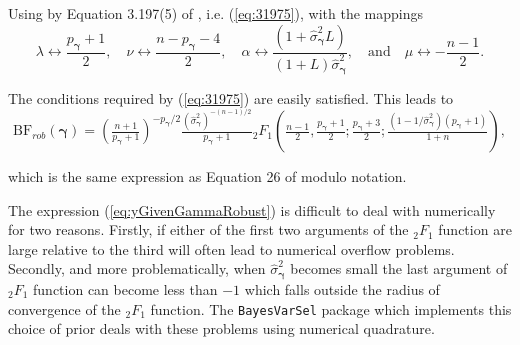 \documentclass[12pt]{article}
\def\vectorfonttwo{\boldsymbol}
\def\vgamma{{\vectorfonttwo \gamma}}             %
\def\ds{\displaystyle}
\begin{document}
\noindent 
Using by Equation 3.197(5) of \cite{Gradshteyn2007}, i.e. (\ref{eq:31975}), 
with the mappings
$$
\lambda \leftrightarrow \frac{p_\vgamma+1}{2},
\quad 
\nu \leftrightarrow \frac{n - p_\vgamma - 4}{2},
\quad 
\alpha \leftrightarrow \frac{(1 + \widehat{\sigma}_\vgamma^2 L)}{(1 + L)\widehat{\sigma}_\vgamma^2},
\quad \mbox{and} \quad 
\mu \leftrightarrow -\frac{n-1}{2}.
$$

\noindent The conditions required by (\ref{eq:31975}) are easily satisfied. 
%
%
This leads to
\begin{equation}\label{eq:yGivenGammaRobust}
\ds \mbox{BF}_{{rob}}(\vgamma)
= \left( \tfrac{n + 1}{ p_\vgamma + 1} \right)^{ - p_\vgamma/2} \tfrac{(\widehat{\sigma}_\vgamma^2)^{-(n-1)/2}}{p_\vgamma+1}
{}_2F_1\left( \tfrac{n-1}{2}, \tfrac{p_\vgamma+1}{2}; \tfrac{p_\vgamma+3}{2}  ; 
\tfrac{(1  - 1/\widehat{\sigma}_\vgamma^2)(p_\vgamma + 1)}{1 + n}  \right),
\end{equation}


\noindent 
which is the same expression as Equation 26 of \cite{Bayarri2012}
modulo notation.

The expression (\ref{eq:yGivenGammaRobust}) is difficult to deal with numerically for two reasons. Firstly, if either of the first 
two arguments of the ${}_2F_1$ function are large relative to the third will often lead to numerical overflow problems. Secondly,
and more problematically, when $\widehat{\sigma}_\vgamma^2$ becomes small the last argument
of ${}_2F_1$ function can become less than $-1$ which falls outside the radius of convergence
of the ${}_2F_1$ function. The {\tt BayesVarSel} package which implements
this choice of prior deals with these problems using numerical
quadrature.
 
\end{document}
